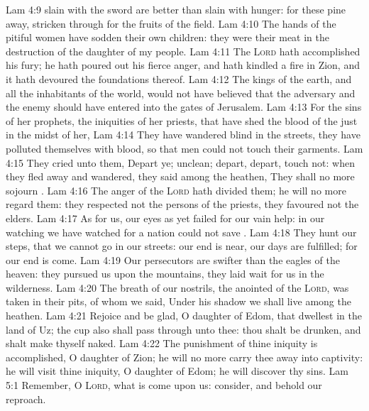\vs Lam 4:9  slain with the sword are better than  slain with hunger: for these pine away, stricken through for  the fruits of the field.
\vs Lam 4:10 The hands of the pitiful women have sodden their own children: they were their meat in the destruction of the daughter of my people.
\vs Lam 4:11 The \textsc{Lord} hath accomplished his fury; he hath poured out his fierce anger, and hath kindled a fire in Zion, and it hath devoured the foundations thereof.
\vs Lam 4:12 The kings of the earth, and all the inhabitants of the world, would not have believed that the adversary and the enemy should have entered into the gates of Jerusalem.
\vs Lam 4:13 For the sins of her prophets,  the iniquities of her priests, that have shed the blood of the just in the midst of her,
\vs Lam 4:14 They have wandered  blind  in the streets, they have polluted themselves with blood, so that men could not touch their garments.
\vs Lam 4:15 They cried unto them, Depart ye;  unclean; depart, depart, touch not: when they fled away and wandered, they said among the heathen, They shall no more sojourn .
\vs Lam 4:16 The anger of the \textsc{Lord} hath divided them; he will no more regard them: they respected not the persons of the priests, they favoured not the elders.
\vs Lam 4:17 As for us, our eyes as yet failed for our vain help: in our watching we have watched for a nation  could not save .
\vs Lam 4:18 They hunt our steps, that we cannot go in our streets: our end is near, our days are fulfilled; for our end is come.
\vs Lam 4:19 Our persecutors are swifter than the eagles of the heaven: they pursued us upon the mountains, they laid wait for us in the wilderness.
\vs Lam 4:20 The breath of our nostrils, the anointed of the \textsc{Lord}, was taken in their pits, of whom we said, Under his shadow we shall live among the heathen.
\vs Lam 4:21 Rejoice and be glad, O daughter of Edom, that dwellest in the land of Uz; the cup also shall pass through unto thee: thou shalt be drunken, and shalt make thyself naked.
\vs Lam 4:22 The punishment of thine iniquity is accomplished, O daughter of Zion; he will no more carry thee away into captivity: he will visit thine iniquity, O daughter of Edom; he will discover thy sins.
\vs Lam 5:1 Remember, O \textsc{Lord}, what is come upon us: consider, and behold our reproach.

